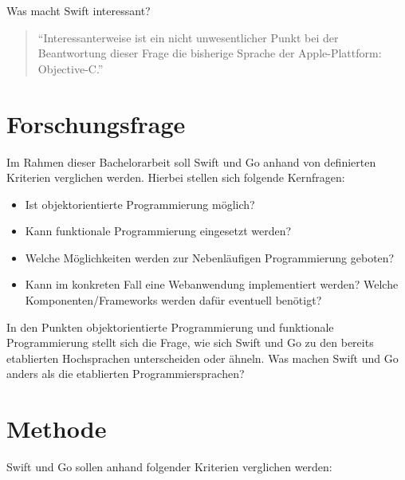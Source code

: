 \documentclass[
    paper=a4,
    bibtotocnumbered,
    liststotocnumbered,
    oneside,
    12pt,
    listof=totoc,
    toc=chapterentrywithdots,
    listof=entryprefix,
]{scrartcl}
\begin{document}
Was macht Swift interessant?
\begin{quote} 
\enquote{Interessanterweise ist ein nicht unwesentlicher Punkt bei der Beantwortung dieser Frage die bisherige Sprache der Apple-Plattform: Objective-C.} \cite{Popp.2015}
\end{quote}

\section{Forschungsfrage}
Im Rahmen dieser Bachelorarbeit soll Swift und Go anhand von definierten Kriterien verglichen werden. Hierbei stellen sich folgende Kernfragen:

\begin{samepage}
\begin{itemize}
    \item Ist objektorientierte Programmierung möglich? 
    \item Kann funktionale Programmierung eingesetzt werden?
    \item Welche Möglichkeiten werden zur Nebenläufigen Programmierung geboten?
    \item Kann im konkreten Fall eine Webanwendung implementiert werden? Welche Komponenten/Frameworks werden dafür eventuell benötigt?
\end{itemize}
\end{samepage}

In den Punkten objektorientierte Programmierung und funktionale Programmierung stellt sich die Frage, wie sich Swift und Go zu den bereits etablierten Hochsprachen unterscheiden oder ähneln. 
Was machen Swift und Go anders als die etablierten Programmiersprachen?

\section{Methode}
Swift und Go sollen anhand folgender Kriterien verglichen werden:
\end{document}

